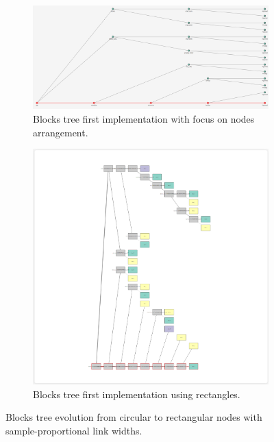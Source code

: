 \begin{figure}[ht!]
    \centering
    \begin{subfigure}[c]{0.45\textwidth}
        \centering
        \includegraphics[width=\textwidth]{images/blocks tree skeleton.png}
        \caption{Blocks tree first implementation with focus on nodes arrangement.}
        \label{fig:Blocks tree first implementation}
    \end{subfigure}
    \hfill
    \begin{subfigure}[c]{0.72\textwidth}
        \centering
        \includegraphics[width=\textwidth]{images/blocks tree first rect.png}
        \caption{Blocks tree first implementation using rectangles.}
        \label{fig:blocksFirstRect}
    \end{subfigure}
    
    \caption{Blocks tree evolution from circular to rectangular nodes with sample-proportional link widths.}
\end{figure}

